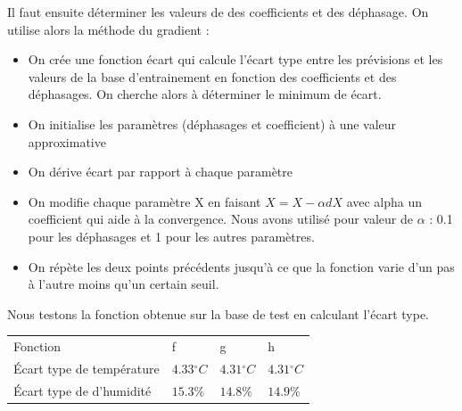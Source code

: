\documentclass[11pt,a4paper]{article}
\begin{document}
Il faut ensuite déterminer les valeurs de des coefficients et des déphasage. On utilise alors la méthode du gradient :
\begin{itemize}
\item On crée une fonction écart qui calcule l'écart type entre les prévisions et les valeurs de la base d'entrainement en fonction des coefficients et des déphasages. On cherche alors à déterminer le minimum de écart.
\item On initialise les paramètres (déphasages et coefficient) à une valeur approximative
\item On dérive écart par rapport à chaque paramètre
\item On modifie chaque paramètre X en faisant $ X = X - \alpha  dX $ avec alpha un coefficient qui aide à la convergence. Nous avons utilisé pour valeur de $\alpha$ : 0.1 pour les déphasages et 1 pour les autres paramètres.
\item On répète les deux points précédents jusqu'à ce que la fonction varie d'un pas à l'autre moins qu'un certain seuil.
\end{itemize}

Nous testons la fonction obtenue sur la base de test en calculant l'écart type.

\begin{tabular}{llll}\hline
\hline
Fonction                             &f                         &g                       &h \\
Écart type de température & $4.33{}^{\circ}C$   & $4.31{}^{\circ}C$   &  $4.31{}^{\circ}C$ \\ 
Écart type de d'humidité    & $15.3\%$   & $14.8\%$   &  $14.9\%$   \\   
\hline 
\end{tabular}
\end{document}
